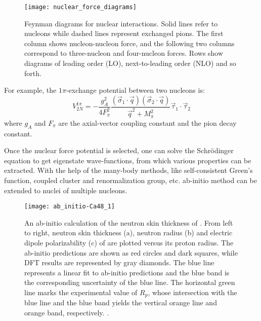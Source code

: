 \begin{figure}[!h]
    \centering
    \texttt{[image: nuclear\_force\_diagrams]}
    \caption[Feynman diagrams for nuclear interactions]
    {Feynman diagrams for nuclear interactions. Solid lines refer to    
    nucleons while dashed lines represent exchanged pions. The first column     
    shows nucleon-nucleon force, and the following two columns correspond to three-nucleon
    and four-nucleon forces. Rows show diagrams of leading order (LO), next-to-leading order (NLO) and so forth.}
    \label{fig:nuclear_interactions_in_order}
\end{figure}

For example, the $1\pi$-exchange potential between two nucleons is:
\begin{equation}
    V_{2N}^{1\pi} = -\frac{g_A^2}{4F_\pi^2}
    \frac{(\vec{\sigma}_1\cdot\vec{q})(\vec{\sigma}_2\cdot\vec{q})}{\vec{q}^2 + M^2_\pi}
    \vec{\tau}_1\cdot\vec{\tau}_2 
\end{equation}
where $g_A$ and $F_\pi$ are the axial-vector coupling constant and the pion 
decay constant.

Once the nuclear force potential is selected, one can solve the Schr\"{o}dinger 
equation to get eigenstate wave-functions, from which various properties can be extracted. 
With the help of the many-body methods, like self-consistent Green's function,
coupled cluster and renormalization group, etc. ab-initio method can be extended
to nuclei of multiple nucleons.

\begin{figure}[!h]
    \centering
    \texttt{[image: ab\_initio-Ca48\_1]}
    \caption[An ab-initio calculation of the neutron skin thickness of \Ca.]
    {An ab-initio calculation of the neutron skin thickness of \Ca.
    From left to right, neutron skin thickness (a), neutron radius (b) and
    electric dipole polarizability (c) of \Ca are plotted versus its proton 
    radius. The ab-initio predictions are shown as red circles and dark squares,
    while DFT results are represented by gray diamonds. The blue line represents 
    a linear fit to ab-initio predictions and the blue band is the corresponding
    uncertainty of the blue line. The horizontal green line marks the experimental
    value of $R_p$, whose intersection with the blue line and the blue band yields
    the vertical orange line and orange band, respectively. \cite{Hagen2016}.}
\end{figure}

